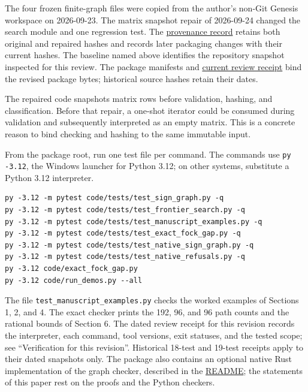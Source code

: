 \documentclass[
  11pt,
]{article}
\newcommand{\passthrough}[1]{#1}
\begin{document}
The four frozen finite-graph files were copied from the author's non-Git
Genesis workspace on 2026-09-23. The matrix snapshot repair of
2026-09-24 changed the search module and one regression test. The
\href{https://github.com/dbccpage/the_symbol_game/blob/main/omega_engine_education/documentation/030_pfp_proposal_fidelity_protocol_pfp/papers/omega_engine_symbol_game/002_pfp_signed_presentations_and_search_frontier/code/PROVENANCE.md}{provenance
record} retains both original and repaired hashes and records later
packaging changes with their current hashes. The baseline named above
identifies the repository snapshot inspected for this review. The
package manifests and
\href{https://github.com/dbccpage/the_symbol_game/blob/main/omega_engine_education/documentation/030_pfp_proposal_fidelity_protocol_pfp/papers/omega_engine_symbol_game/002_pfp_signed_presentations_and_search_frontier/docs/preprint_review_validation_2026_10_02.json}{current
review receipt} bind the revised package bytes; historical source hashes
retain their dates.

The repaired code snapshots matrix rows before validation, hashing, and
classification. Before that repair, a one-shot iterator could be
consumed during validation and subsequently interpreted as an empty
matrix. This is a concrete reason to bind checking and hashing to the
same immutable input.

From the package root, run one test file per command. The commands use
\passthrough{\lstinline!py -3.12!}, the Windows launcher for Python
3.12; on other systems, substitute a Python 3.12 interpreter.

\begin{lstlisting}
py -3.12 -m pytest code/tests/test_sign_graph.py -q
py -3.12 -m pytest code/tests/test_frontier_search.py -q
py -3.12 -m pytest code/tests/test_manuscript_examples.py -q
py -3.12 -m pytest code/tests/test_exact_fock_gap.py -q
py -3.12 -m pytest code/tests/test_native_sign_graph.py -q
py -3.12 -m pytest code/tests/test_native_refusals.py -q
py -3.12 code/exact_fock_gap.py
py -3.12 code/run_demos.py --all
\end{lstlisting}

The file \nolinkurl{test_manuscript_examples.py} checks the worked
examples of Sections 1, 2, and 4. The exact checker prints the 192, 96,
and 96 path counts and the rational bounds of Section 6. The dated
review receipt for this revision records the interpreter, each command,
tool versions, exit statuses, and the tested scope; see ``Verification
for this revision''. Historical 18-test and 19-test receipts apply to
their dated snapshots only. The package also contains an optional native
Rust implementation of the graph checker, described in the
\href{https://github.com/dbccpage/the_symbol_game/blob/main/omega_engine_education/documentation/030_pfp_proposal_fidelity_protocol_pfp/papers/omega_engine_symbol_game/002_pfp_signed_presentations_and_search_frontier/README.md}{README};
the statements of this paper rest on the proofs and the Python checkers.
\end{document}
